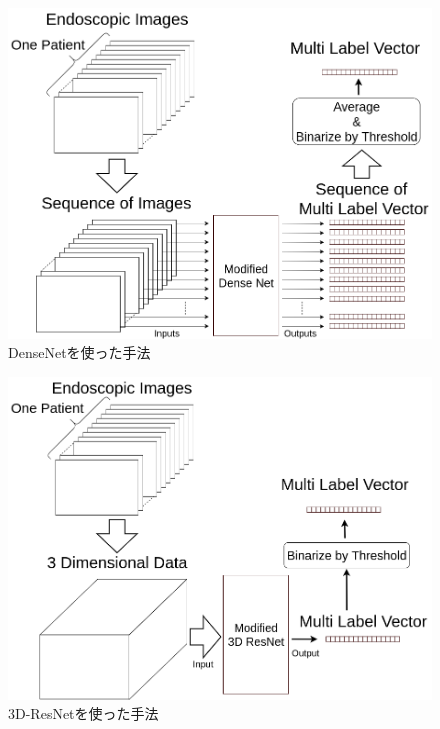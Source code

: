 \begin{figure}[htbp]
    \begin{center}
        \includegraphics[width=122mm]{./fig/ieice2.png}
        \caption{DenseNetを使った手法}
        \label{fig:densenet}
    \end{center}
\end{figure}

\begin{figure}[htbp]
    \begin{center}
        \includegraphics[width=122mm]{./fig/ieice3.png}
        \caption{3D-ResNetを使った手法}
        \label{fig:3d_resnet}
    \end{center}
\end{figure}

\newpage
